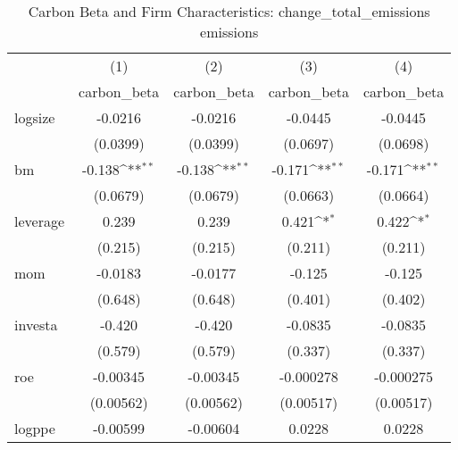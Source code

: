 \begin{table}[htbp]\centering
\def\sym#1{\ifmmode^{#1}\else\(^{#1}\)\fi}
\caption{Carbon Beta and Firm Characteristics: change\_total\_emissions emissions}
\begin{tabular}{l*{4}{c}}
\hline\hline
                    &\multicolumn{1}{c}{(1)}&\multicolumn{1}{c}{(2)}&\multicolumn{1}{c}{(3)}&\multicolumn{1}{c}{(4)}\\
                    &\multicolumn{1}{c}{carbon\_beta}&\multicolumn{1}{c}{carbon\_beta}&\multicolumn{1}{c}{carbon\_beta}&\multicolumn{1}{c}{carbon\_beta}\\
\hline
logsize             &     -0.0216         &     -0.0216         &     -0.0445         &     -0.0445         \\
                    &    (0.0399)         &    (0.0399)         &    (0.0697)         &    (0.0698)         \\
[1em]
bm                  &      -0.138\sym{**} &      -0.138\sym{**} &      -0.171\sym{**} &      -0.171\sym{**} \\
                    &    (0.0679)         &    (0.0679)         &    (0.0663)         &    (0.0664)         \\
[1em]
leverage            &       0.239         &       0.239         &       0.421\sym{*}  &       0.422\sym{*}  \\
                    &     (0.215)         &     (0.215)         &     (0.211)         &     (0.211)         \\
[1em]
mom                 &     -0.0183         &     -0.0177         &      -0.125         &      -0.125         \\
                    &     (0.648)         &     (0.648)         &     (0.401)         &     (0.402)         \\
[1em]
investa             &      -0.420         &      -0.420         &     -0.0835         &     -0.0835         \\
                    &     (0.579)         &     (0.579)         &     (0.337)         &     (0.337)         \\
[1em]
roe                 &    -0.00345         &    -0.00345         &   -0.000278         &   -0.000275         \\
                    &   (0.00562)         &   (0.00562)         &   (0.00517)         &   (0.00517)         \\
[1em]
logppe              &    -0.00599         &    -0.00604         &      0.0228         &      0.0228         \\

\end{tabular}
\end{table}
